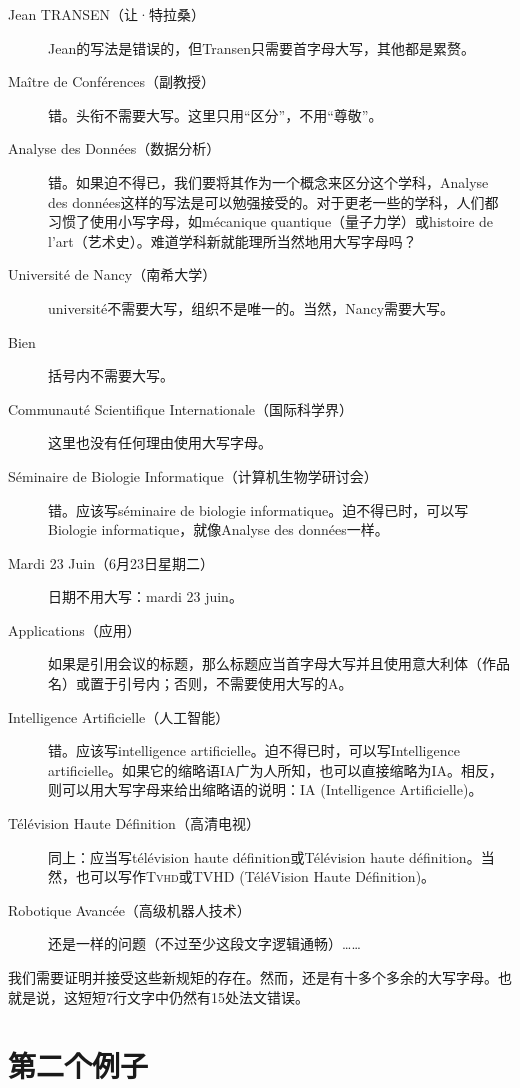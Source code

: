 \begin{description}
    \item[Jean TRANSEN（让·特拉桑）] Jean的写法是错误的，但Transen只需要首字母大写，其他都是累赘。
    \item[Maître de Conférences（副教授）] 错。头衔不需要大写。这里只用``区分''，不用``尊敬''。
    \item[Analyse des Données（数据分析）] 错。如果迫不得已，我们要将其作为一个概念来区分这个学科，Analyse des données这样的写法是可以勉强接受的。对于更老一些的学科，人们都习惯了使用小写字母，如mécanique quantique（量子力学）或histoire de l'art（艺术史）。难道学科新就能理所当然地用大写字母吗？
    \item[Université de Nancy（南希大学）] université不需要大写，组织不是唯一的。当然，Nancy需要大写。
    \item[Bien] 括号内不需要大写。
    \item[Communauté Scientifique Internationale（国际科学界）] 这里也没有任何理由使用大写字母。
    \item[Séminaire de Biologie Informatique（计算机生物学研讨会）] 错。应该写séminaire de biologie informatique。迫不得已时，可以写Biologie informatique，就像Analyse des données一样。
    \item[Mardi 23 Juin（6月23日星期二）] 日期不用大写：mardi 23 juin。
    \item[Applications（应用）] 如果是引用会议的标题，那么标题应当首字母大写并且使用意大利体（作品名）或置于引号内；否则，不需要使用大写的A。
    \item[Intelligence Artificielle（人工智能）] 错。应该写intelligence artificielle。迫不得已时，可以写Intelligence artificielle。如果它的缩略语IA广为人所知，也可以直接缩略为IA。相反，则可以用大写字母来给出缩略语的说明：IA (Intelligence Artificielle)。
    \item[Télévision Haute Définition（高清电视）] 同上：应当写télévision haute définition或Télévision haute définition。当然，也可以写作\textsc{Tvhd}或TVHD (TéléVision Haute Définition)。
    \item[Robotique Avancée（高级机器人技术）] 还是一样的问题（不过至少这段文字逻辑通畅）……
\end{description}

我们需要证明并接受这些新规矩的存在。然而，还是有十多个多余的大写字母。也就是说，这短短7行文字中仍然有15处法文错误。

\section{第二个例子}

